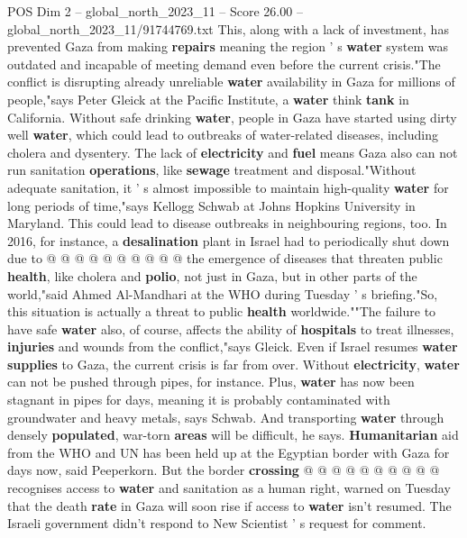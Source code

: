 \begin{textsample}{POS Dim 2 – global\_north\_2023\_11 – Score 26.00 – global\_north\_2023\_11/91744769.txt}
This, along with a lack of investment, has prevented Gaza from making \textbf{repairs} meaning the region ' s \textbf{water} system was outdated and incapable of meeting demand even before the current crisis."The conflict is disrupting already unreliable \textbf{water} availability in Gaza for millions of people,"says Peter Gleick at the Pacific Institute, a \textbf{water} think \textbf{tank} in California.
Without safe drinking \textbf{water}, people in Gaza have started using dirty well \textbf{water}, which could lead to outbreaks of water-related diseases, including cholera and dysentery.
The lack of \textbf{electricity} and \textbf{fuel} means Gaza also can not run sanitation \textbf{operations}, like \textbf{sewage} treatment and disposal."Without adequate sanitation, it ' s almost impossible to maintain high-quality \textbf{water} for long periods of time,"says Kellogg Schwab at Johns Hopkins University in Maryland.
This could lead to disease outbreaks in neighbouring regions, too.
In 2016, for instance, a \textbf{desalination} plant in Israel had to periodically shut down due to @ @ @ @ @ @ @ @ @ @ the emergence of diseases that threaten public \textbf{health}, like cholera and \textbf{polio}, not just in Gaza, but in other parts of the world,"said Ahmed Al-Mandhari at the WHO during Tuesday ' s briefing."So, this situation is actually a threat to public \textbf{health} worldwide.""The failure to have safe \textbf{water} also, of course, affects the ability of \textbf{hospitals} to treat illnesses, \textbf{injuries} and wounds from the conflict,"says Gleick.
Even if Israel resumes \textbf{water} \textbf{supplies} to Gaza, the current crisis is far from over.
Without \textbf{electricity}, \textbf{water} can not be pushed through pipes, for instance.
Plus, \textbf{water} has now been stagnant in pipes for days, meaning it is probably contaminated with groundwater and heavy metals, says Schwab.
And transporting \textbf{water} through densely \textbf{populated}, war-torn \textbf{areas} will be difficult, he says. \textbf{Humanitarian} aid from the WHO and UN has been held up at the Egyptian border with Gaza for days now, said Peeperkorn.
But the border \textbf{crossing} @ @ @ @ @ @ @ @ @ @ recognises access to \textbf{water} and sanitation as a human right, warned on Tuesday that the death \textbf{rate} in Gaza will soon rise if access to \textbf{water} isn't resumed.
The Israeli government didn't respond to New Scientist ' s request for comment.

\end{textsample}
